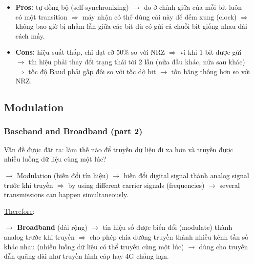 \begin{itemize}
    \item \textbf{Pros:} tự đồng bộ (self-synchronizing) $\rightarrow$ do ở chính giữa của mỗi bit luôn có một transition $\Rightarrow$ máy nhận có thể dùng cái này để đếm xung (clock) $\Rightarrow$ không bao giờ bị nhầm lẫn giữa các bit dù có gửi cả chuỗi bit giống nhau dài cách mấy.
    \item \textbf{Cons:} hiệu suất thấp, chỉ đạt cỡ 50\% so với NRZ $\Rightarrow$ vì khi 1 bit được gửi $\rightarrow$ tín hiệu phải thay đổi trạng thái tới 2 lần (nửa đầu khác, nửa sau khác) $\Rightarrow$ tốc độ Baud phải gấp đôi so với tốc dộ bit $\rightarrow$ tốn băng thông hơn so với NRZ.
\end{itemize}



\subsection{Modulation}

\subsubsection{Baseband and Broadband (part 2)}

\noindent
Vấn đề được đặt ra: làm thế nào để truyền dữ liệu đi xa hơn và truyền được nhiều luồng dữ liệu cùng một lúc?

$\rightarrow$ Modulation (biến đổi tín hiệu) $\rightarrow$ biến đổi digital signal thành analog signal trước khi truyền $\Rightarrow$ by using different carrier signals (frequencies) $\rightarrow$ several transmissions can happen simultaneously.
\medskip

\noindent
\underline{Therefore}:

\textbf{$\rightarrow$ Broadband} (dải rộng) $\rightarrow$ tín hiệu số được biến đổi (modulate) thành analog trước khi truyền $\Rightarrow$ cho phép chia đường truyền thành nhiều kênh tần số khác nhau (nhiều luồng dữ liệu có thể truyền cùng một lúc) $\rightarrow$ dùng cho truyền dẫn quãng dài như truyền hình cáp hay 4G chẳng hạn.
\medskip


